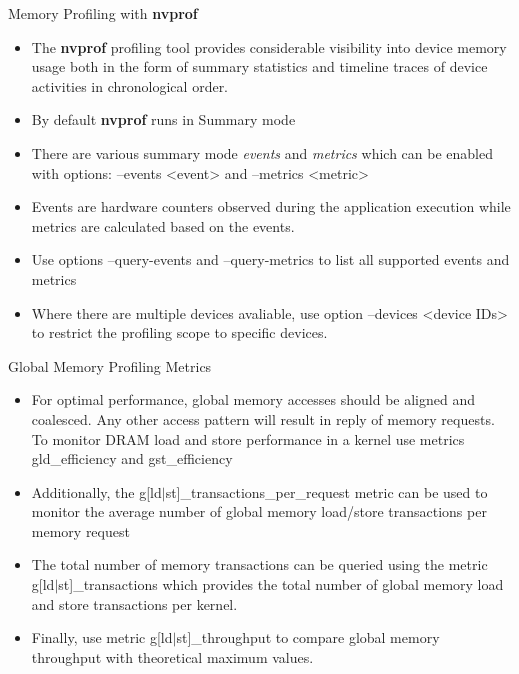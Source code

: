 \documentclass[handout]{beamer}
\begin{document}
\begin{frame}{Memory Profiling with {\selectfont \textbf{nvprof}}}
\begin{itemize}
	\item<1->The {\selectfont \textbf{nvprof}} profiling tool provides considerable visibility into device memory usage both in the form of summary statistics and timeline traces of device activities in chronological order. 
	\item<1->By default {\selectfont \textbf{nvprof}} runs in Summary mode
	\item<1->There are various summary mode \emph{events} and \emph{metrics} which can be enabled with options: {\selectfont --events <event>} and {\selectfont --metrics <metric>}
	\item<1->Events are hardware counters observed during the application execution while metrics are calculated based on the events.
	\item<1->Use options {\selectfont --query-events} and {\selectfont --query-metrics} to list all supported events and metrics
	\item<1->Where there are multiple devices avaliable, use option {\selectfont --devices <device IDs>} to restrict the profiling scope to specific devices.
\end{itemize}
\end{frame}

\begin{frame}{Global Memory Profiling Metrics}
\begin{itemize}
	\item<1->For optimal performance, global memory accesses should be aligned and coalesced.  Any other access pattern will result in reply of memory requests.  To monitor DRAM load and store performance in a kernel use metrics {\selectfont gld\_efficiency} and {\selectfont gst\_efficiency}
	\item<1->Additionally, the {\selectfont g[ld$\vert$st]\_transactions\_per\_request} metric can be used to monitor the average number of global memory load/store transactions per memory request
	\item<1->The total number of memory transactions can be queried using the metric {\selectfont g[ld$\vert$st]\_transactions} which provides the total number of global memory load and store transactions per kernel.
	\item<1->Finally, use metric {\selectfont g[ld$\vert$st]\_throughput} to compare global memory throughput with theoretical maximum values. 
\end{itemize}
\end{frame}
\end{document}
